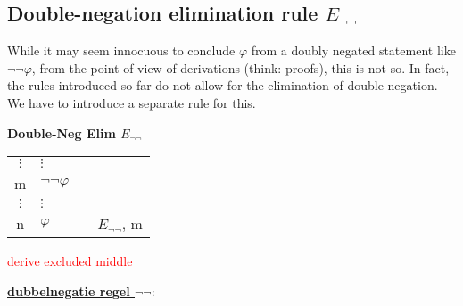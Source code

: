 \documentclass[nobib,nofonts]{tufte-handout}
\begin{document}
\subsection{Double-negation elimination rule $E_{\neg\neg}$}

While it may seem innocuous to conclude $\varphi$ from a doubly negated statement like $\neg\neg\varphi$, from the point of view of derivations (think: proofs), this is not so.
In fact, the rules introduced so far do not allow for the elimination of double negation.
We have to introduce a separate rule for this.

\bigskip
\noindent \colorbox{mygray!60}{\centering
  \begin{minipage}[t]{0.35\linewidth}
    \textbf{Double-Neg Elim $E_{\neg\neg}$}
  \end{minipage}
  \begin{minipage}[t]{0.55\linewidth}
    \begin{tabular}{clcl}
            $\vdots$ & $\vdots$  & \\
      m              & $\neg \neg \varphi$ &  \\
            $\vdots$ & $\vdots$  & \\
      n              & $\varphi$    & & $E_{\neg \neg}$, m
    \end{tabular}
  \end{minipage}
}
\bigskip

\textcolor{red}{derive excluded middle}

\newpage




\noindent \textbf{\underline{dubbelnegatie regel $\neg\neg$}}:

\end{document}
